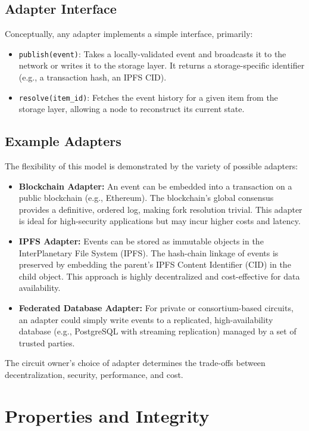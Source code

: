 \documentclass{article}
\begin{document}
\subsection{Adapter Interface}
Conceptually, any adapter implements a simple interface, primarily:
\begin{itemize}
    \item \texttt{publish(event)}: Takes a locally-validated event and broadcasts it to the network or writes it to the storage layer. It returns a storage-specific identifier (e.g., a transaction hash, an IPFS CID).    \item \texttt{resolve(item\_id)}: Fetches the event history for a given item from the storage layer, allowing a node to reconstruct its current state.
\end{itemize}

\subsection{Example Adapters}
The flexibility of this model is demonstrated by the variety of possible adapters:
\begin{itemize}
    \item \textbf{Blockchain Adapter:} An event can be embedded into a transaction on a public blockchain (e.g., Ethereum). The blockchain's global consensus provides a definitive, ordered log, making fork resolution trivial. This adapter is ideal for high-security applications but may incur higher costs and latency.    \item \textbf{IPFS Adapter:} Events can be stored as immutable objects in the InterPlanetary File System (IPFS). The hash-chain linkage of events is preserved by embedding the parent's IPFS Content Identifier (CID) in the child object. This approach is highly decentralized and cost-effective for data availability.    \item \textbf{Federated Database Adapter:} For private or consortium-based circuits, an adapter could simply write events to a replicated, high-availability database (e.g., PostgreSQL with streaming replication) managed by a set of trusted parties.
\end{itemize}
The circuit owner's choice of adapter determines the trade-offs between decentralization, security, performance, and cost.

\section{Properties and Integrity}
\end{document}
